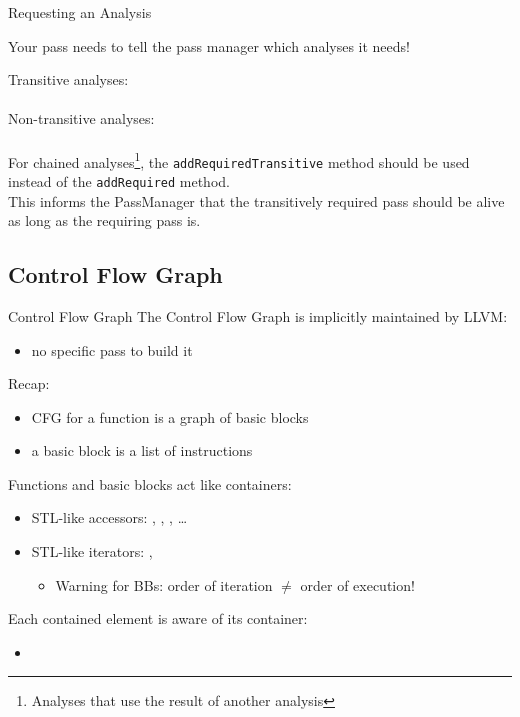 \begin{frame}{Requesting an Analysis}
\begin{center}
Your pass needs to tell the pass manager which analyses it needs!

\vfill
Transitive analyses:\\
\\
\medskip
Non-transitive analyses: \\
\\

\vfill
For \alert{chained analyses}\footnote{Analyses that use the result of another analysis}, the \texttt{addRequiredTransitive} method
should be used instead of the \texttt{addRequired} method.\\
\medskip
{\small
This informs the PassManager that the transitively required pass
should be alive as long as the requiring pass is.}
\end{center}
\end{frame}


\subsection{Control Flow Graph}


\begin{frame}{Control Flow Graph}
The Control Flow Graph is implicitly maintained by LLVM:

\begin{itemize}
\item no specific pass to build it
\end{itemize}

\vfill
Recap:

\begin{itemize}
\item CFG for a function is a graph of basic blocks
\item a basic block is a list of instructions
\end{itemize}

\vfill
Functions and basic blocks act like containers:

\begin{itemize}
\item STL-like accessors: , ,
      , \ldots
\item STL-like iterators: , 
	\begin{itemize}
	\item Warning for BBs: order of iteration $\neq$ order of execution!
	\end{itemize}
\end{itemize}

\vfill
Each contained element is aware of its container:

\begin{itemize}
\item {}
\end{itemize}
\end{frame}


